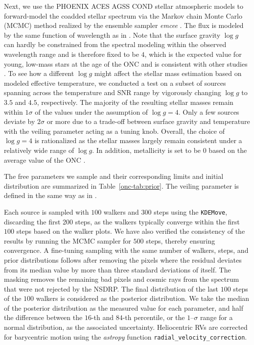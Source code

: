 \documentclass[12pt]{ucsddissertation}
\begin{document}
\begin{CJK*}{UTF8}{gbsn}
Next, we use the PHOENIX ACES AGSS COND stellar atmospheric models \citep{Husser-2013} to forward-model the coadded stellar spectrum via the Markov chain Monte Carlo (MCMC) method \citep[][]{Butler-1996, Blake-2007, Blake-2008, Blake-2010, Burgasser-2016} realized by the ensemble sampler \textit{emcee} \citep[][]{Foreman-Mackey-2013}. The flux is modeled by the same function of wavelength as in . Note that the surface gravity $\log g$ can hardly be constrained from the spectral modeling within the observed wavelength range and is therefore fixed to be $4$, which is the expected value for young, low-mass stars at the age of the ONC and is consistent with other studies \citep[e.g.,][]{Kounkel-2018}. To see how a different $\log g$ might affect the stellar mass estimation based on modeled effective temperature, we conducted a test on a subset of sources spanning across the temperature and SNR range by vigorously changing $\log g$ to $3.5$ and $4.5$, respectively. The majority of the resulting stellar masses remain within $1\sigma$ of the values under the assumption of $\log g=4$. Only a few sources deviate by $2\sigma$ or more due to a trade-off between surface gravity and temperature with the veiling parameter acting as a tuning knob. Overall, the choice of $\log g=4$ is rationalized as the stellar masses largely remain consistent under a relatively wide range of $\log g$. In addition, metallicity is set to be $0$ based on the average value of the ONC \citep[e.g.,][]{D'Orazi-2009}. 

The free parameters we sample and their corresponding limits and initial distribution are summarized in Table~\ref{onc-tab:prior}. The veiling parameter is defined in the same way as in .

Each source is sampled with $100$ walkers and $300$ steps using the \texttt{KDEMove}, discarding the first 200 steps, as the walkers typically converge within the first $100$ steps based on the walker plots. We have also verified the consistency of the results by running the MCMC sampler for $500$ steps, thereby ensuring convergence. A fine-tuning sampling with the same number of walkers, steps, and prior distributions follows after removing the pixels where the residual deviates from its median value by more than three standard deviations of itself. The masking removes the remaining bad pixels and cosmic rays from the spectrum that were not rejected by the NSDRP. The final distribution of the last $100$ steps of the $100$ walkers is considered as the posterior distribution. We take the median of the posterior distribution as the measured value for each parameter, and half the difference between the $16$-th and $84$-th percentile, or the $1$--$\sigma$ range for a normal distribution, as the associated uncertainty. Heliocentric RVs are corrected for barycentric motion using the \textit{astropy}
function \texttt{radial\_velocity\_correction}.


\end{CJK*}
\end{document}
